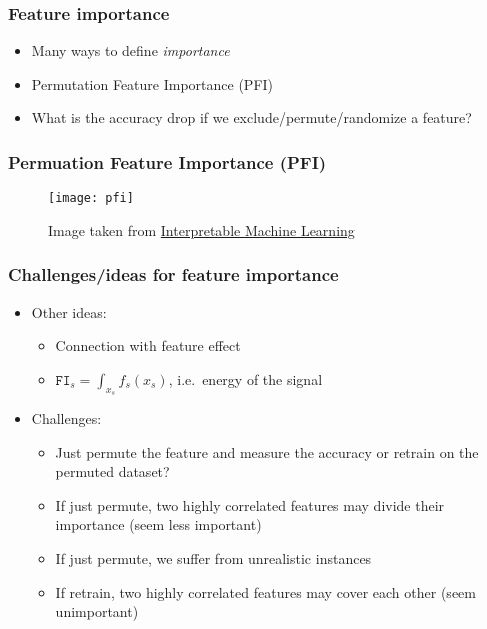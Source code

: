 \begin{frame}
  \frametitle{Feature importance}
  \begin{itemize}
    \item Many ways to define \emph{importance}
    \item Permutation Feature Importance (PFI)
    \item What is the accuracy drop if we exclude/permute/randomize a feature?
  \end{itemize}
\end{frame}


\begin{frame}
  \frametitle{Permuation Feature Importance (PFI)}
  \begin{figure}
    \centering
    \texttt{[image: pfi]}
    \caption{Image taken from \href{https://christophm.github.io/interpretable-ml-book/feature-importance.html}{Interpretable Machine Learning}}
  \end{figure}
\end{frame}


\begin{frame}
  \frametitle{Challenges/ideas for feature importance}
  \begin{itemize}
    \item Other ideas:
    \begin{itemize}
      \item Connection with feature effect
      \item $\mathtt{FI}_s = \int_{x_s} f_s(x_s)$, i.e.~energy of the signal
    \end{itemize}
    \item Challenges:
    \begin{itemize}
      \item Just permute the feature and measure the accuracy or retrain on the permuted dataset?
      \item If just permute, two highly correlated features may divide their importance (seem less important)
      \item If just permute, we suffer from unrealistic instances
      \item If retrain, two highly correlated features may cover each other (seem unimportant)
    \end{itemize}
  \end{itemize}
\end{frame}



